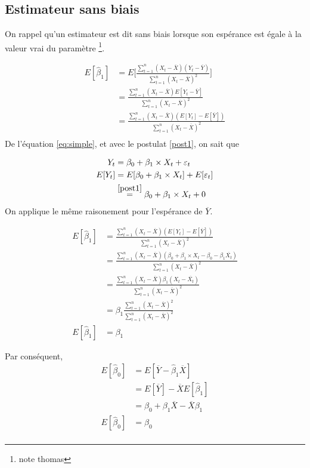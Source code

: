 \documentclass[11pt,french]{report}
\begin{document}
\subsection{Estimateur sans biais}
On rappel qu'un estimateur est dit sans biais lorsque son espérance est égale à la valeur vrai du paramètre \footnote{note thomas}.

\begin{align*}
E[\hat{\beta}_1] &= E \Bigg[ \frac{\sum_{t=1}^n(X_t- \overline{X})(Y_t - \overline{Y})}{\sum_{t=1}^n(X_t - \overline{X})^2} \Bigg] \\
&= \frac{\sum_{t=1}^n(X_t- \overline{X})E[Y_t - \overline{Y}]}{\sum_{t=1}^n(X_t - \overline{X})^2} \\
&= \frac{\sum_{t=1}^n(X_t- \overline{X})(E[Y_t] - E[\overline{Y}])}{\sum_{t=1}^n(X_t - \overline{X})^2} \\
\end{align*}
De l'équation \ref{eq:simple}, et avec le postulat \ref{post1}, on sait que 

\begin{align*}
Y_t &= \beta_0 + \beta_1\times X_t + \varepsilon_t \\
E[Y_t] &= E[\beta_0 + \beta_1\times X_t] + E[\varepsilon_t] \\
&\overset{\ref{post1}}{=} \beta_0 + \beta_1\times X_t + 0 \\
\end{align*}
On applique le même raisonement pour l'espérance de $\overline{Y}$. 

\begin{align*}
E[\hat{\beta}_1] &= \frac{\sum_{t=1}^n(X_t- \overline{X})(E[Y_t] - E[\overline{Y}])}{\sum_{t=1}^n(X_t - \overline{X})^2} \\
&= \frac{\sum_{t=1}^n(X_t- \overline{X})(\beta_0 + \beta_1\times X_t - \beta_0 - \beta_1\overline{X_t})}{\sum_{t=1}^n(X_t - \overline{X})^2} \\
&= \frac{\sum_{t=1}^n(X_t- \overline{X})\beta_1 (X_t - \overline{X_t})}{\sum_{t=1}^n(X_t - \overline{X})^2} \\
&= \beta_1 \frac{\sum_{t=1}^n(X_t- \overline{X})^2}{\sum_{t=1}^n(X_t - \overline{X})^2} \\
E[\hat{\beta}_1] &= \beta_1
\end{align*}
\bigskip

Par conséquent,
\begin{align*}
E[\hat{\beta}_0] &= E[\overline{Y} - \hat{\beta}_1 \overline{X}] \\
&= E[\overline{Y}] - \overline{X} E[\hat{\beta}_1]  \\
&= \beta_0 + \beta_1\overline{X} - \overline{X}\beta_1 \\
E[\hat{\beta}_0]  &= \beta_0 \\
\end{align*}
\end{document}
